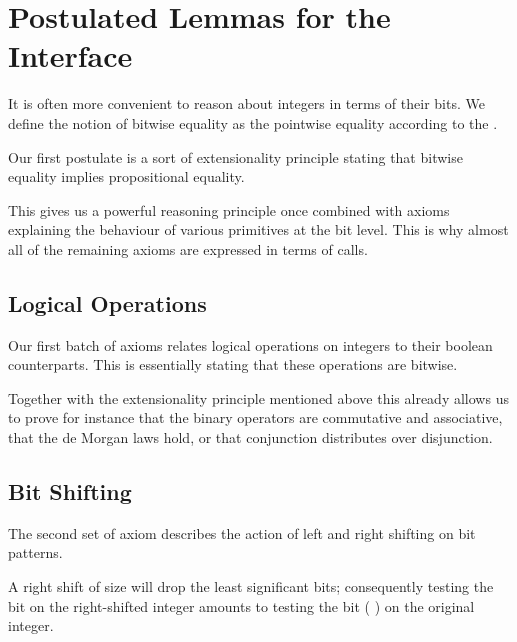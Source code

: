 \section{Postulated Lemmas for the  Interface}\label{appendix:postulated}

It is often more convenient to reason about integers in terms of their bits.
We define the notion of bitwise equality as the pointwise equality according
to the .


Our first postulate is a sort of extensionality principle stating that bitwise
equality implies propositional equality.


This gives us a powerful reasoning principle once combined with axioms
explaining the behaviour of various primitives at the bit level.
%
This is why almost all of the remaining axioms are expressed in terms
of  calls.

\subsection{Logical Operations}

Our first batch of axioms relates logical operations on integers to their
boolean counterparts. This is essentially stating that these operations are
bitwise.


Together with the extensionality principle mentioned above this already
allows us to prove for instance that the binary operators are commutative
and associative, that the de Morgan laws hold, or that conjunction distributes
over disjunction.

\subsection{Bit Shifting}

The second set of axiom describes the action of left and right shifting on
bit patterns.

A right shift of size  will drop the  least
significant bits; consequently testing the bit  on the
right-shifted integer amounts to testing the bit
( \IdrisFunction{+} ) on the original integer.

